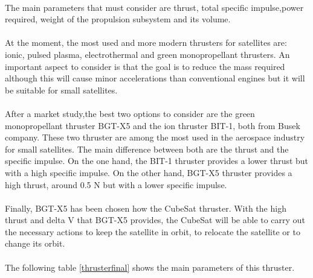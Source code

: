 \paragraph{}
The main parameters that must consider are thrust, total specific impulse,power required, weight of the  propulsion subsystem and its volume.

\paragraph{}
At the moment, the most used and more modern thrusters for satellites are: ionic, pulsed plasma, electrothermal and green monopropellant thrusters. An important aspect to consider is that the goal is to reduce the mass required although this will cause minor accelerations than conventional engines but it will be suitable for small satellites.

\paragraph{}
After a market study,the best two options to consider are the green monopropellant thruster BGT-X5 and the ion thruster BIT-1, both from Busek company. These two thruster are among the most used in the aerospace industry for small satellites. The main difference between both are the thrust and the specific impulse. On the one hand, the BIT-1 thruster provides a lower thrust but with a high specific impulse. On the other hand, BGT-X5 thruster provides a high thrust, around 0.5 N but with a lower specific impulse.

\paragraph{}
Finally, BGT-X5 has been chosen how the CubeSat thruster. With the high thrust and delta V that BGT-X5 provides, the CubeSat will be able to carry out the necessary actions to keep the satellite in orbit, to relocate the satellite or to change its orbit.


\paragraph{}
The following table \ref{thrusterfinal} shows the main parameters of this thruster.

